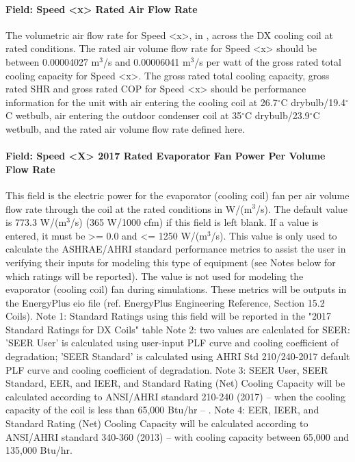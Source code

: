 \paragraph{Field: Speed \textless{}x\textgreater{} Rated Air Flow Rate}\label{field-speed-x-rated-air-flow-rate}

The volumetric air flow rate for Speed \textless{}x\textgreater{}, in \si{\volumeFlowRate}, across the DX cooling coil at rated conditions. The rated air volume flow rate for Speed \textless{}x\textgreater{} should be between 0.00004027 m\(^{3}\)/s and 0.00006041 m\(^{3}\)/s per watt of the gross rated total cooling capacity for Speed \textless{}x\textgreater{}. The gross rated total cooling capacity, gross rated SHR and gross rated COP for Speed \textless{}x\textgreater{} should be performance information for the unit with air entering the cooling coil at 26.7$^\circ$C drybulb/19.4$^\circ$C wetbulb, air entering the outdoor condenser coil at 35$^\circ$C drybulb/23.9$^\circ$C wetbulb, and the rated air volume flow rate defined here.

\paragraph{Field: Speed \textless{}X\textgreater{} 2017 Rated Evaporator Fan Power Per Volume Flow Rate}

This field is the electric power for the evaporator (cooling coil) fan per air volume flow rate through the coil at the rated conditions in W/(m\(^{3}\)/s). The default value is 773.3 W/(m\(^{3}\)/s) (365 W/1000 cfm) if this field is left blank. If a value is entered, it must be \textgreater{}= 0.0 and \textless{}= 1250 W/(m\(^{3}\)/s). This value is only used to calculate the ASHRAE/AHRI standard performance metrics to assist the user in verifying their inputs for modeling this type of equipment (see Notes below for which ratings will be reported).  The value is not used for modeling the evaporator (cooling coil) fan during simulations.  These metrics will be outputs in the EnergyPlus eio file (ref. EnergyPlus Engineering Reference, Section 15.2 Coils).
Note 1: Standard Ratings using this field will be reported in the "2017 Standard Ratings for DX Coils" table
Note 2: two values are calculated for SEER: 'SEER User' is calculated using user-input PLF curve and cooling coefficient of degradation; 'SEER Standard' is calculated using AHRI Std 210/240-2017 default PLF curve and cooling coefficient of degradation.
Note 3: SEER User, SEER Standard, EER, and IEER, and Standard Rating (Net) Cooling Capacity will be calculated according to ANSI/AHRI standard 210-240 (2017) -- when the cooling capacity of the coil is less than 65,000 Btu/hr -- .
Note 4: EER, IEER, and Standard Rating (Net) Cooling Capacity will be calculated according to ANSI/AHRI standard 340-360 (2013) -- with cooling capacity between 65,000 and 135,000 Btu/hr.

